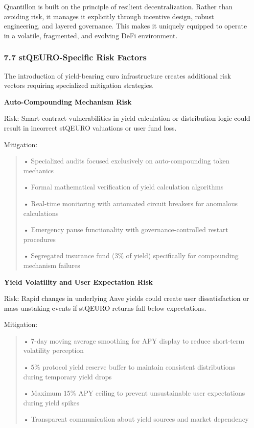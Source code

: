 Quantillon is built on the principle of resilient decentralization.
Rather than avoiding risk, it manages it explicitly through incentive
design, robust engineering, and layered governance. This makes it
uniquely equipped to operate in a volatile, fragmented, and evolving
DeFi environment.

\hypertarget{stqeuro-specific-risk-factors}{%
\subsubsection{7.7 stQEURO-Specific Risk
Factors}\label{stqeuro-specific-risk-factors}}

The introduction of yield-bearing euro infrastructure creates additional
risk vectors requiring specialized mitigation strategies.

\textbf{Auto-Compounding Mechanism Risk}

Risk: Smart contract vulnerabilities in yield calculation or
distribution logic could result in incorrect stQEURO valuations or user
fund loss.

Mitigation:

\begin{quote}
• Specialized audits focused exclusively on auto-compounding token
mechanics

• Formal mathematical verification of yield calculation algorithms

• Real-time monitoring with automated circuit breakers for anomalous
calculations

• Emergency pause functionality with governance-controlled restart
procedures

• Segregated insurance fund (3\% of yield) specifically for compounding
mechanism failures
\end{quote}

\textbf{Yield Volatility and User Expectation Risk}

Risk: Rapid changes in underlying Aave yields could create user
dissatisfaction or mass unstaking events if stQEURO returns fall below
expectations.

Mitigation:

\begin{quote}
• 7-day moving average smoothing for APY display to reduce short-term
volatility perception

• 5\% protocol yield reserve buffer to maintain consistent distributions
during temporary yield drops

• Maximum 15\% APY ceiling to prevent unsustainable user expectations
during yield spikes

• Transparent communication about yield sources and market dependency
\end{quote}

